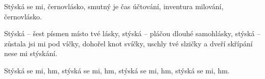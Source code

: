 \beginverse{}
Stýská se mi, černovlásko,
smutný je čas účtování,
inventura milování, černovlásko.  
\endverse{}

\beginchorus{}
Stýská -- šest písmen místo tvé lásky,
stýská -- pláčou dlouhé samohlásky,
stýská -- zůstala jsi mi pod víčky,
dohořel knot svíčky, uschly tvé slzičky
a dveří skřípání nese mi stýskání.
\endchorus{}

\beginverse*{}
Stýská se mi, hm,  stýská se mi, hm, 
stýská se mi, hm,  stýská se mi, hm. 
\endverse{}

\endsong{}

